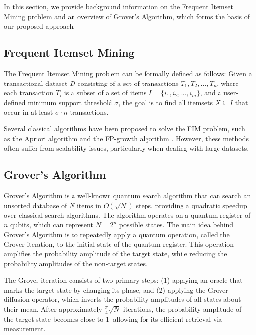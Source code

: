 In this section, we provide background information on the Frequent Itemset Mining problem and an overview of Grover's Algorithm, which forms the basis of our proposed approach.

\subsection{Frequent Itemset Mining}
\label{subsec:FIM}

The Frequent Itemset Mining problem can be formally defined as follows: Given a transactional dataset $D$ consisting of a set of transactions $T_1, T_2, \dots, T_n$, where each transaction $T_i$ is a subset of a set of items $I = \{i_1, i_2, \dots, i_m\}$, and a user-defined minimum support threshold $\sigma$, the goal is to find all itemsets $X \subseteq I$ that occur in at least $\sigma \cdot n$ transactions.

Several classical algorithms have been proposed to solve the FIM problem, such as the Apriori algorithm \cite{agrawal1994fast} and the FP-growth algorithm \cite{han2000mining}. However, these methods often suffer from scalability issues, particularly when dealing with large datasets.

\subsection{Grover's Algorithm}
\label{subsec:grover}

Grover's Algorithm \cite{grover1996fast} is a well-known quantum search algorithm that can search an unsorted database of $N$ items in $O(\sqrt{N})$ steps, providing a quadratic speedup over classical search algorithms. The algorithm operates on a quantum register of $n$ qubits, which can represent $N = 2^n$ possible states. The main idea behind Grover's Algorithm is to repeatedly apply a quantum operation, called the Grover iteration, to the initial state of the quantum register. This operation amplifies the probability amplitude of the target state, while reducing the probability amplitudes of the non-target states.

The Grover iteration consists of two primary steps: (1) applying an oracle that marks the target state by changing its phase, and (2) applying the Grover diffusion operator, which inverts the probability amplitudes of all states about their mean. After approximately $\frac{\pi}{4}\sqrt{N}$ iterations, the probability amplitude of the target state becomes close to 1, allowing for its efficient retrieval via measurement.

